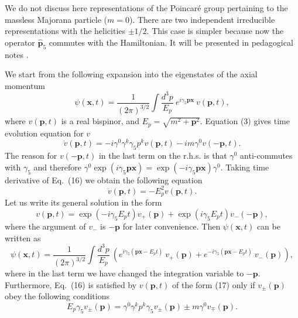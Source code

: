 \documentclass[12pt]{article}
\begin{document}
 We do not discuss  here   representations of the Poincar\'e group pertaining to  the  massless  Majorana particle ($m=0$). There are two independent irreducible representations with the helicities $\pm 1/2$. This case is simpler because now the operator $\hat{\mathbf{p}}_5$  commutes with the Hamiltonian.  It will be presented in  pedagogical notes  \cite{14}. 



We start from the following  expansion  into the eigenstates of the axial momentum
\begin{equation}
\psi(\mathbf{x}, t) =\frac{1}{ (2\pi)^{3/2}}  \int\! \frac{d^3p}{E_p}\: e^{i \gamma_5 \mathbf{p} \mathbf{x}} \:   v(\mathbf{p}, t), 
 \end{equation}
where $v(\mathbf{p}, t)$  is a real bispinor, and   $E_p = \sqrt{m^2 + \mathbf{p}^2}$.   Equation (3)  gives time evolution equation for $v$  
\begin{equation}
\dot{v}(\mathbf{p}, t)  = - i \gamma^0 \gamma^k \gamma_5 p^k v(\mathbf{p}, t) - im \gamma^0 v(-\mathbf{p}, t).  
\end{equation}
The reason for $v(-\mathbf{p}, t)$   in the last term on the r.h.s.  is that $\gamma^0$ anti-commutes with $\gamma_5$ and therefore
$\gamma^0 \exp(i \gamma_5 \mathbf{p} \mathbf{x}) =   \exp(- i \gamma_5 \mathbf{p} \mathbf{x}) \gamma^0.$
Taking time derivative of  Eq.\ (16)  we obtain the following equation
\[ \ddot{v}(\mathbf{p}, t) = - E_p^2 v(\mathbf{p}, t). \]  Let us write its general solution in the form 
\begin{equation}
v(\mathbf{p}, t) = \exp(-i\gamma_5 E_p t) v_+(\mathbf{p})  +   \exp(i\gamma_5 E_p t) v_-(-\mathbf{p}), 
\end{equation}
where the argument  of $v_-$ is  $-\mathbf{p}$  for later convenience. 
Then $\psi(\mathbf{x}, t) $ can be written as
\begin{equation}
\psi(\mathbf{x}, t) =\frac{1}{ (2\pi)^{3/2}}  \int\! \frac{d^3p}{E_p}\:\left( e^{i \gamma_5 (\mathbf{p} \mathbf{x}-E_pt)}\:   v_+(\mathbf{p})  +   e^{-i \gamma_5 (\mathbf{p} \mathbf{x}-E_pt)}\:   v_-(\mathbf{p})   \right),
 \end{equation}
where in the last term we have changed the integration variable to $- \mathbf{p}$. 
Furthermore,  Eq.\ (16)  is satisfied   by $v(\mathbf{p}, t)$ of the form (17) only if   $ v_{\pm}(\mathbf{p})$ obey the following conditions
\begin{equation}
E_p  \gamma_5 v_{\pm}(\mathbf{p}) = \gamma^0 \gamma^k p^k \gamma_5 v_{\pm}(\mathbf{p}) \pm m \gamma^0  v_{\mp}(\mathbf{p}) . 
\end{equation}
\end{document}

